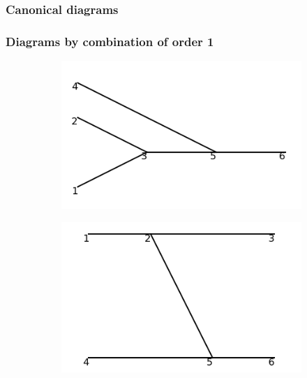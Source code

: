 \documentclass[11pt,a4paper,twoside,pdf]{article}
\numberwithin{equation}{section}
\begin{document}
\subsubsection{Canonical diagrams}

\subsubsection{Diagrams by combination of order 1}



\begin{figure}[h!]
    \centering
    \begin{subfigure}[t]{0.19\textwidth}
        \centering
        \includegraphics[width=\textwidth]{plots/order2/from_order1/1.png}
        \caption{ }
        \label{fig:order2_from_order1/1}
    \end{subfigure}%
    \hfill
    \begin{subfigure}[t]{0.19\textwidth}
        \centering
        \includegraphics[width=\textwidth]{plots/order2/from_order1/2.png}

\end{subfigure}
\end{figure}
\end{document}
